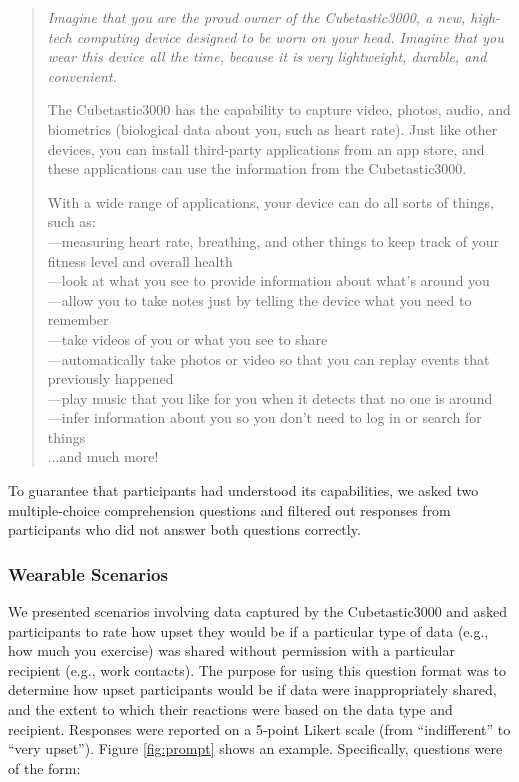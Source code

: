 \documentclass[conference]{IEEEtran}
\begin{document}
\begin{quotation}
{\it Imagine that you are the proud owner of the Cubetastic3000, a new, high-tech computing device designed to be worn on your head. Imagine that you wear this device all the time, because it is very lightweight, durable, and convenient.

The Cubetastic3000 has the capability to capture video, photos, audio, and biometrics (biological data about you, such as heart rate). Just like other devices, you can install third-party applications from an app store, and these applications can use the information from the Cubetastic3000.

With a wide range of applications, your device can do all sorts of things, such as:\\

\noindent---measuring heart rate, breathing, and other things to keep track of your fitness level and overall health\\
\noindent---look at what you see to provide information about what's around you\\
\noindent---allow you to take notes just by telling the device what you need to remember\\
\noindent---take videos of you or what you see to share\\
\noindent---automatically take photos or video so that you can replay events that previously happened\\
\noindent---play music that you like for you when it detects that no one is around\\
\noindent---infer information about you so you don't need to log in or search for things\\
\noindent ...and much more!}
\end{quotation}

To guarantee that participants had understood its capabilities, we asked two multiple-choice comprehension questions and filtered out responses from participants who did not answer both questions correctly.

\subsubsection{Wearable Scenarios}
We presented scenarios involving data captured by the Cubetastic3000 and asked participants to rate how upset they would be if a particular type of data (e.g., how much you exercise) was shared without permission with a particular recipient (e.g., work contacts). The purpose for using this question format was to determine how upset participants would be if data were inappropriately shared, and the extent to which their reactions were based on the data type and recipient. Responses were reported on a 5-point Likert scale (from ``indifferent'' to ``very upset''). Figure \ref{fig:prompt} shows an example.  Specifically, questions were of the form: 
\end{document}
